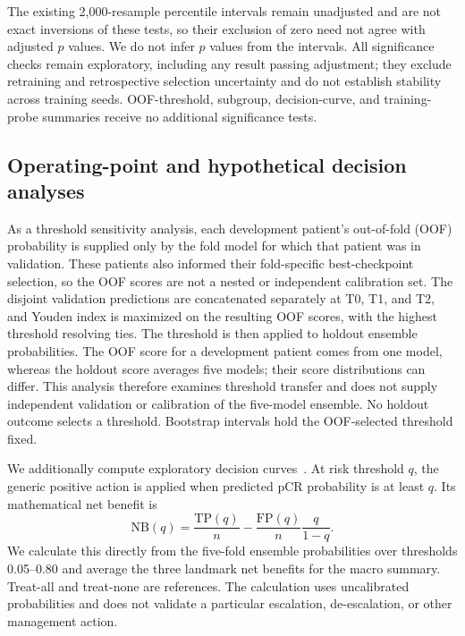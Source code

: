 The existing 2,000-resample percentile intervals remain unadjusted and are not exact inversions of these tests, so their exclusion of zero need not agree with adjusted $p$ values. We do not infer $p$ values from the intervals. All significance checks remain exploratory, including any result passing adjustment; they exclude retraining and retrospective selection uncertainty and do not establish stability across training seeds. OOF-threshold, subgroup, decision-curve, and training-probe summaries receive no additional significance tests.

\subsection{Operating-point and hypothetical decision analyses}
As a threshold sensitivity analysis, each development patient's out-of-fold (OOF) probability is supplied only by the fold model for which that patient was in validation. These patients also informed their fold-specific best-checkpoint selection, so the OOF scores are not a nested or independent calibration set. The disjoint validation predictions are concatenated separately at T0, T1, and T2, and Youden index is maximized on the resulting OOF scores, with the highest threshold resolving ties. The threshold is then applied to holdout ensemble probabilities. The OOF score for a development patient comes from one model, whereas the holdout score averages five models; their score distributions can differ. This analysis therefore examines threshold transfer and does not supply independent validation or calibration of the five-model ensemble. No holdout outcome selects a threshold. Bootstrap intervals hold the OOF-selected threshold fixed.

We additionally compute exploratory decision curves~\citep{vickers2006dca}. At risk threshold $q$, the generic positive action is applied when predicted pCR probability is at least $q$. Its mathematical net benefit is
\begin{equation}
 \mathrm{NB}(q)=\frac{\mathrm{TP}(q)}{n}
 -\frac{\mathrm{FP}(q)}{n}\frac{q}{1-q}.
\end{equation}
We calculate this directly from the five-fold ensemble probabilities over thresholds 0.05--0.80 and average the three landmark net benefits for the macro summary. Treat-all and treat-none are references. The calculation uses uncalibrated probabilities and does not validate a particular escalation, de-escalation, or other management action.

